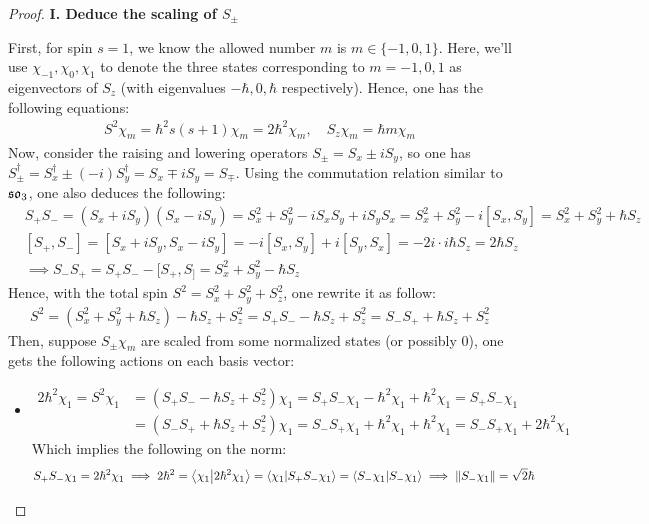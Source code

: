 \documentclass{article}
\begin{document}
\begin{proof}

    \hfil

    \textbf{I. Deduce the scaling of $S_\pm$}

    First, for spin $s=1$, we know the allowed number $m$ is $m\in\{-1,0,1\}$. Here, we'll use $\chi_{-1},\chi_0,\chi_1$ to denote the three states corresponding to $m=-1,0,1$ as eigenvectors of $S_z$ (with eigenvalues $-\hbar, 0, \hbar$ respectively). Hence, one has the following equations:
    \begin{align}
        S^2 \chi_m = \hbar^2 s(s+1)\chi_m = 2\hbar^2\chi_m,\quad S_z\chi_m = \hbar m\chi_m
    \end{align}
    Now, consider the raising and lowering operators $S_\pm = S_x\pm i S_y$, so one has $S_\pm^\dagger = S_x^\dagger \pm (-i) S_y^\dagger = S_x\mp iS_y = S_\mp$. Using the commutation relation similar to $\mathfrak{so}_3$, one also deduces the following:
    \begin{align}
        &S_+S_- = (S_x+iS_y)(S_x-iS_y) = S_x^2 + S_y^2 -iS_xS_y +iS_y S_x = S_x^2+S_y^2-i[S_x,S_y] = S_x^2+S_y^2+\hbar S_z\\
        &[S_+,S_-] = [S_x+iS_y, S_x-iS_y] = -i[S_x,S_y]+i[S_y,S_x] = -2i\cdot i\hbar S_z = 2\hbar S_z\\
        &\implies S_-S_+  = S_+S_- - [S_+,S_] = S_x^2+S_y^2 - \hbar S_z
    \end{align}
    Hence, with the total spin $S^2 = S_x^2+S_y^2+S_z^2$, one rewrite it as follow:
    \begin{align}
        S^2 = (S_x^2+S_y^2 + \hbar S_z) - \hbar S_z + S_z^2 = S_+S_- - \hbar S_z+S_z^2 = S_-S_+ + \hbar S_z + S_z^2
    \end{align}
    Then, suppose $S_\pm \chi_m$ are scaled from some normalized states (or possibly $0$), one gets the following actions on each basis vector:
    \begin{itemize}
        \item[$\chi_1$:]
        \begin{align}
            2\hbar^2 \chi_1 = S^2\chi_1 &= (S_+S_- -\hbar S_z+S_z^2)\chi_1 = S_+S_-\chi_1 - \hbar^2\chi_1 + \hbar^2\chi_1 = S_+S_-\chi_1\\
            &= (S_-S_+ + \hbar S_z+S_z^2)\chi_1 = S_-S_+\chi_1 + \hbar^2\chi_1+\hbar^2\chi_1 = S_-S_+\chi_1 + 2\hbar^2\chi_1
        \end{align}
        Which implies the following on the norm:
        \begin{align}
            &S_+S_-\chi_1 = 2\hbar^2\chi_1 \implies 2\hbar^2 = \braket{\chi_1}{2\hbar^2\chi_1} = \braket{\chi_1}{S_+S_-\chi_1} = \braket{S_-\chi_1}{S_-\chi_1} \implies \|S_-\chi_1\| = \sqrt{2}\hbar\\

\end{align}
\end{itemize}
\end{proof}
\end{document}
